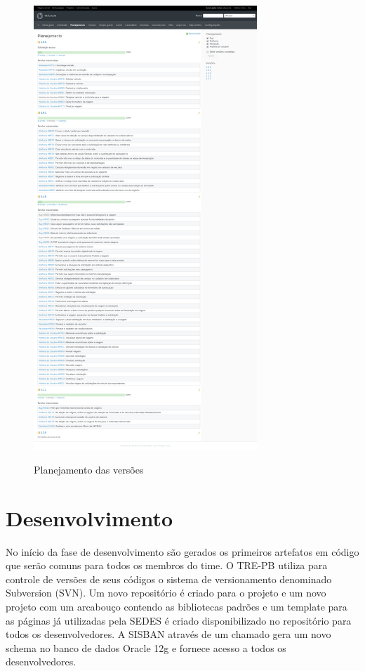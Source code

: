 \begin{figure}[!htb]
    \centering
    \caption{Planejamento das versões}
    \includegraphics[width=0.75\textwidth]{dados/figuras/veiculos-planejamento.png}
    \label{fig:figura-planejamento}
\end{figure}

\section{Desenvolvimento}
\label{sec:atividadesRealizadasDesenvolvimento}

No início da fase de desenvolvimento são gerados os primeiros artefatos em código que serão comuns para todos os membros do time. O TRE-PB utiliza para controle de versões de seus códigos o sistema de versionamento denominado Subversion (SVN). Um novo repositório é criado para o projeto e um novo projeto com um arcabouço contendo as bibliotecas padrões e um template para as páginas já utilizadas pela SEDES é criado disponibilizado no repositório para todos os desenvolvedores. A SISBAN através de um chamado gera um novo schema no banco de dados Oracle 12g e fornece acesso a todos os desenvolvedores.


